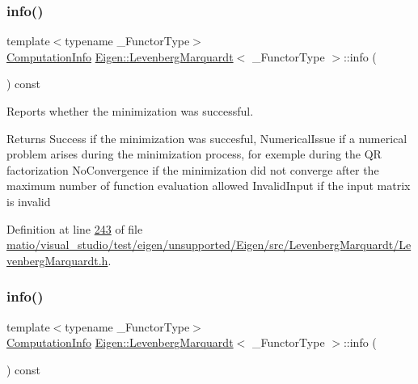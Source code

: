 \subsubsection{\texorpdfstring{info()}{info()}\hspace{0.1cm}{\footnotesize\ttfamily [1/2]}}
{\footnotesize\ttfamily template$<$typename \+\_\+\+Functor\+Type$>$ \\
\hyperlink{group__enums_ga85fad7b87587764e5cf6b513a9e0ee5e}{Computation\+Info} \hyperlink{class_eigen_1_1_levenberg_marquardt}{Eigen\+::\+Levenberg\+Marquardt}$<$ \+\_\+\+Functor\+Type $>$\+::info (\begin{DoxyParamCaption}{ }\end{DoxyParamCaption}) const\hspace{0.3cm}{\ttfamily [inline]}}



Reports whether the minimization was successful. 

\begin{DoxyReturn}{Returns}
{\ttfamily Success} if the minimization was succesful, {\ttfamily Numerical\+Issue} if a numerical problem arises during the minimization process, for exemple during the QR factorization {\ttfamily No\+Convergence} if the minimization did not converge after the maximum number of function evaluation allowed {\ttfamily Invalid\+Input} if the input matrix is invalid 
\end{DoxyReturn}


Definition at line \hyperlink{matio_2visual__studio_2test_2eigen_2unsupported_2_eigen_2src_2_levenberg_marquardt_2_levenberg_marquardt_8h_source_l00243}{243} of file \hyperlink{matio_2visual__studio_2test_2eigen_2unsupported_2_eigen_2src_2_levenberg_marquardt_2_levenberg_marquardt_8h_source}{matio/visual\+\_\+studio/test/eigen/unsupported/\+Eigen/src/\+Levenberg\+Marquardt/\+Levenberg\+Marquardt.\+h}.

\mbox{\label{class_eigen_1_1_levenberg_marquardt_ae65bdccd2487989ae9b25f9c2e9dfab9}} 
\subsubsection{\texorpdfstring{info()}{info()}\hspace{0.1cm}{\footnotesize\ttfamily [2/2]}}
{\footnotesize\ttfamily template$<$typename \+\_\+\+Functor\+Type$>$ \\
\hyperlink{group__enums_ga85fad7b87587764e5cf6b513a9e0ee5e}{Computation\+Info} \hyperlink{class_eigen_1_1_levenberg_marquardt}{Eigen\+::\+Levenberg\+Marquardt}$<$ \+\_\+\+Functor\+Type $>$\+::info (\begin{DoxyParamCaption}{ }\end{DoxyParamCaption}) const\hspace{0.3cm}{\ttfamily [inline]}}



